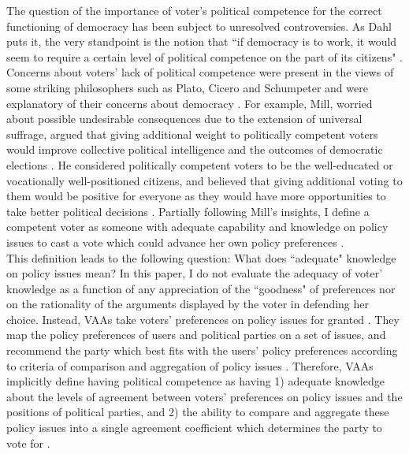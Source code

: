 \documentclass{scrartcl}
\begin{document}
The question of the importance of voter's political competence for the correct functioning of democracy has been subject to unresolved controversies. As Dahl puts it, the very standpoint is the notion that ``if democracy is to work, it would seem to require a certain level of political competence on the part of its citizens" \cite{dahl1992problem}. Concerns about voters' lack of political competence were present in the views of some striking philosophers such as Plato, Cicero and Schumpeter and were explanatory of their concerns about democracy \cite{caplan2011myth}. For example, Mill, worried about possible undesirable consequences due to the extension of universal suffrage, argued that giving additional weight to politically competent voters would improve collective political intelligence and the outcomes of
democratic elections \cite{stuart1859liberty}. He considered politically competent voters to be the well-educated or vocationally well-positioned citizens, and believed that giving additional voting to them would be positive for everyone as they would have more opportunities to take better political decisions \cite{stuart1859liberty}. Partially following Mill's insights, I define a competent voter as someone with adequate capability and knowledge on policy issues to cast a vote which could advance her own policy
preferences \cite{carpini1996americans}. 
\\

This definition leads to the following question: What does ``adequate" knowledge on policy issues mean? In this paper, I do not evaluate the adequacy of voter' knowledge as a function of any appreciation of the ``goodness" of preferences nor on the rationality of the arguments displayed by the voter in defending her choice. Instead, VAAs take voters' preferences on policy issues for granted \cite{anderson2014matching}. They map the policy preferences of users and political parties on a set of issues, and recommend the party which best fits with the users' policy preferences according to criteria of comparison and aggregation of policy issues \cite{Mendez2012}. Therefore, VAAs implicitly define having political competence as having 1) adequate knowledge about the levels of agreement between voters' preferences on policy issues and the positions of political parties, and 2) the ability to compare and aggregate these policy issues into a single agreement coefficient which determines the  party to vote for \cite{Mendez2017}. 
\\ 
\end{document}
